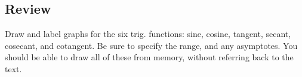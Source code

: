 \clearpage
\subsection{Review}

Draw and label graphs for the six trig. functions: sine, cosine, tangent, secant, cosecant, and cotangent.  Be sure to specify the range, and any asymptotes.  You should be able to draw all of these from memory, without referring back to the text.\\

